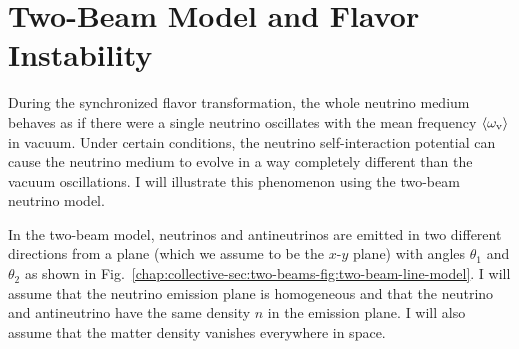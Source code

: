 






\section{\label{chap:collective-sec:two-beams}Two-Beam Model and Flavor Instability}

During the synchronized flavor transformation, the whole neutrino medium behaves as if there were a single neutrino oscillates with the mean frequency $\langle \omega_\mathrm v \rangle$ in vacuum. Under certain conditions, the neutrino self-interaction potential can cause the neutrino medium to evolve in a way completely different than the vacuum oscillations. I will illustrate this phenomenon using the two-beam neutrino model.

In the two-beam model, neutrinos and antineutrinos are emitted in two different directions from a plane (which we assume to be the $x$-$y$ plane) with angles $\theta_1$ and $\theta_2$ as shown in Fig.~\ref{chap:collective-sec:two-beams-fig:two-beam-line-model}. I will assume that the neutrino emission plane is homogeneous and that the neutrino and antineutrino have the same density $n$ in the emission plane. I will also assume that the matter density vanishes everywhere in space.



